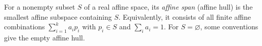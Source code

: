 
For a nonempty subset $S$ of a real affine space, its \emph{affine span} (affine hull) is the smallest affine subspace containing $S$. Equivalently, it consists of all finite affine combinations $\sum_{i=1}^k a_ip_i$ with $p_i\in S$ and $\sum_i a_i=1$. For $S=\varnothing$, some conventions give the empty affine hull.
